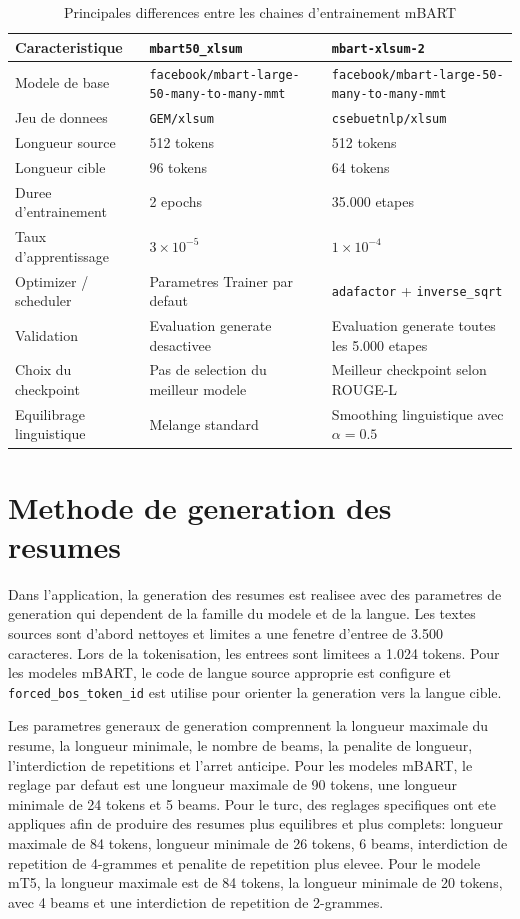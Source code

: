 \begin{table}[t]
\caption{Principales differences entre les chaines d'entrainement mBART}
\label{tab:training-configs-fr}
\centering
\begin{tabular}{|p{4.0cm}|p{4.6cm}|p{4.6cm}|}
\hline
\textbf{Caracteristique} & \textbf{\texttt{mbart50\_xlsum}} & \textbf{\texttt{mbart-xlsum-2}} \\
\hline
Modele de base & \texttt{facebook/mbart-large-50-many-to-many-mmt} & \texttt{facebook/mbart-large-50-many-to-many-mmt} \\
\hline
Jeu de donnees & \texttt{GEM/xlsum} & \texttt{csebuetnlp/xlsum} \\
\hline
Longueur source & 512 tokens & 512 tokens \\
\hline
Longueur cible & 96 tokens & 64 tokens \\
\hline
Duree d'entrainement & 2 epochs & 35.000 etapes \\
\hline
Taux d'apprentissage & $3 \times 10^{-5}$ & $1 \times 10^{-4}$ \\
\hline
Optimizer / scheduler & Parametres Trainer par defaut & \texttt{adafactor} + \texttt{inverse\_sqrt} \\
\hline
Validation & Evaluation generate desactivee & Evaluation generate toutes les 5.000 etapes \\
\hline
Choix du checkpoint & Pas de selection du meilleur modele & Meilleur checkpoint selon ROUGE-L \\
\hline
Equilibrage linguistique & Melange standard & Smoothing linguistique avec $\alpha=0.5$ \\
\hline
\end{tabular}
\end{table}

\section{Methode de generation des resumes}

Dans l'application, la generation des resumes est realisee avec des parametres de generation qui dependent de la famille du modele et de la langue. Les textes sources sont d'abord nettoyes et limites a une fenetre d'entree de 3.500 caracteres. Lors de la tokenisation, les entrees sont limitees a 1.024 tokens. Pour les modeles mBART, le code de langue source approprie est configure et \texttt{forced\_bos\_token\_id} est utilise pour orienter la generation vers la langue cible.

Les parametres generaux de generation comprennent la longueur maximale du resume, la longueur minimale, le nombre de beams, la penalite de longueur, l'interdiction de repetitions et l'arret anticipe. Pour les modeles mBART, le reglage par defaut est une longueur maximale de 90 tokens, une longueur minimale de 24 tokens et 5 beams. Pour le turc, des reglages specifiques ont ete appliques afin de produire des resumes plus equilibres et plus complets: longueur maximale de 84 tokens, longueur minimale de 26 tokens, 6 beams, interdiction de repetition de 4-grammes et penalite de repetition plus elevee. Pour le modele mT5, la longueur maximale est de 84 tokens, la longueur minimale de 20 tokens, avec 4 beams et une interdiction de repetition de 2-grammes.


